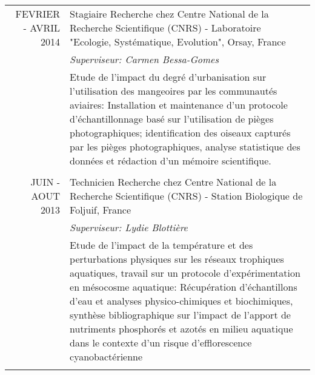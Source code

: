\documentclass[a4paper,10pt]{article}
\begin{document}
\begin{tabular}{r|p{11cm}}
\textsc{FEVRIER - AVRIL 2014} & Stagiaire Recherche chez Centre National de la Recherche Scientifique (CNRS) - Laboratoire "Ecologie, Systématique, Evolution", Orsay, France \\&\emph{Superviseur: Carmen Bessa-Gomes}\\&\footnotesize{Etude de l'impact du degré d'urbanisation sur l'utilisation des mangeoires par les communautés aviaires: Installation et maintenance d'un protocole d'échantillonnage basé sur l'utilisation de pièges photographiques; identification des oiseaux capturés par les pièges photographiques, analyse statistique des données et rédaction d'un mémoire scientifique.}\\\multicolumn{2}{c}{} \\

\textsc{JUIN - AOUT 2013} & Technicien Recherche chez Centre National de la Recherche Scientifique (CNRS) - Station Biologique de Foljuif, France \\&\emph{Superviseur: Lydie Blottière}\\&\footnotesize{Etude de l'impact de la température et des perturbations physiques sur les réseaux trophiques aquatiques, travail sur un protocole d'expérimentation en mésocosme aquatique: Récupération d'échantillons d'eau et analyses physico-chimiques et biochimiques, synthèse bibliographique sur l'impact de l'apport de nutriments phosphorés et azotés en milieu aquatique dans le contexte d'un risque d'efflorescence cyanobactérienne}\\\multicolumn{2}{c}{} \\
\end{tabular}

\end{document}
